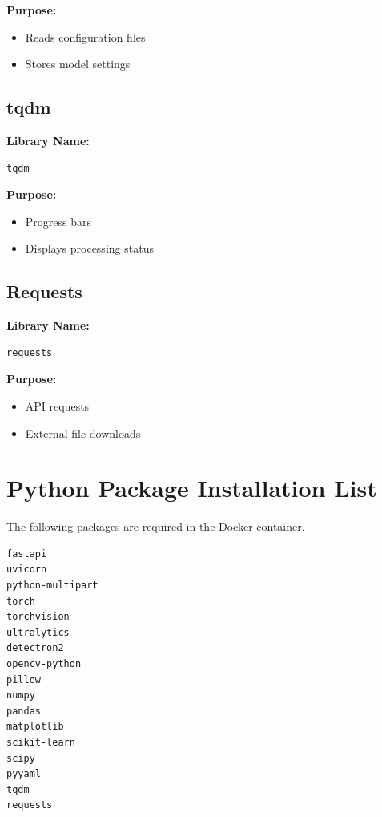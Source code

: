 \documentclass[12pt]{article}
\begin{document}
\textbf{Purpose:}
\begin{itemize}
    \item Reads configuration files
    \item Stores model settings
\end{itemize}

\subsection{tqdm}

\textbf{Library Name:}
\begin{verbatim}
tqdm
\end{verbatim}

\textbf{Purpose:}
\begin{itemize}
    \item Progress bars
    \item Displays processing status
\end{itemize}

\subsection{Requests}

\textbf{Library Name:}
\begin{verbatim}
requests
\end{verbatim}

\textbf{Purpose:}
\begin{itemize}
    \item API requests
    \item External file downloads
\end{itemize}

\section{Python Package Installation List}

The following packages are required in the Docker container.

\begin{verbatim}
fastapi
uvicorn
python-multipart
torch
torchvision
ultralytics
detectron2
opencv-python
pillow
numpy
pandas
matplotlib
scikit-learn
scipy
pyyaml
tqdm
requests
\end{verbatim}

\end{document}
